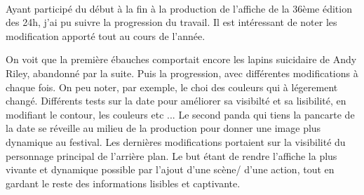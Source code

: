 \begin{center}
                \\
            \end{center}
            
                            Ayant participé du début à la fin à la production de l'affiche de la 36ème édition des 24h, j'ai pu suivre la progression du travail.
                Il est intéressant de noter les modification apporté tout au cours de l'année.
                
                On voit que la première ébauches comportait encore les lapins suicidaire de Andy Riley, abandonné par la suite. Puis la progression, avec différentes modifications à chaque fois.
                On peu noter, par exemple, le choi des couleurs qui à légerement changé.
                Différents tests sur la date pour améliorer sa visibilté et sa lisibilité, en modifiant le contour, les couleurs etc ...
                Le second panda qui tiens la pancarte de la date se réveille au milieu de la production pour donner une image plus dynamique au festival.
                Les dernières modifications portaient sur la visibilité du personnage principal de l'arrière plan.
                Le but étant de rendre l'affiche la plus vivante et dynamique possible par l'ajout d'une scène/ d'une action, tout en gardant le reste des informations lisibles et captivante.
            
